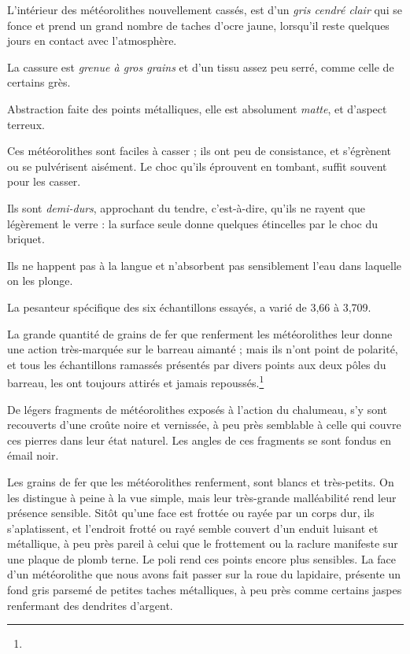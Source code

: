 \documentclass[a4paper, 12pt, oneside, french]{article}
\begin{document}
\og L'intérieur des météorolithes nouvellement cassés, est d'un \emph{gris cendré clair} qui se fonce et prend un grand nombre de taches d'ocre jaune, lorsqu'il reste quelques jours en contact avec l'atmosphère. \fg

\og La cassure est \emph{grenue à gros grains} et d'un tissu assez peu serré, comme celle de certains grès. \fg

\og Abstraction faite des points métalliques, elle est absolument \emph{matte}, et d'aspect terreux. \fg

\og Ces météorolithes sont faciles à casser ; ils ont peu de consistance, et s'égrènent ou se pulvérisent aisément. Le choc qu'ils éprouvent en tombant, suffit souvent pour les casser. \fg

\og Ils sont \emph{demi-durs}, approchant du tendre, c'est-à-dire, qu'ils ne rayent que légèrement le verre : la surface seule donne quelques étincelles par le choc du briquet. \fg

\og Ils ne happent pas à la langue et n'absorbent pas sensiblement l'eau dans laquelle on les plonge. \fg

\og La pesanteur spécifique des six échantillons essayés, a varié de 3,66 à 3,709. \fg

\og La grande quantité de grains de fer que renferment les météorolithes leur donne une action très-marquée sur le barreau aimanté ; mais ils n'ont point de polarité, et tous les échantillons ramassés présentés par divers points aux deux pôles du barreau, les ont toujours attirés et jamais repoussés.\footnote{} \fg

\og De légers fragments de météorolithes exposés à l'action du chalumeau, s'y sont recouverts d'une croûte noire et vernissée, à peu près semblable à celle qui couvre ces pierres dans leur état naturel. Les angles de ces fragments se sont fondus en émail noir. \fg

\og Les grains de fer que les météorolithes renferment, sont blancs et très-petits. On les distingue à peine à la vue simple, mais leur très-grande malléabilité rend leur présence sensible. Sitôt qu'une face est frottée ou rayée par un corps dur, ils s'aplatissent, et l'endroit frotté ou rayé semble couvert d'un enduit luisant et métallique, à peu près pareil à celui que le frottement ou la raclure manifeste sur une plaque de plomb terne. Le poli rend ces points encore plus sensibles. La face d'un météorolithe que nous avons fait passer sur la roue du lapidaire, présente un fond gris parsemé de petites taches métalliques, à peu près comme certains jaspes renfermant des dendrites d'argent. \fg
\end{document}

